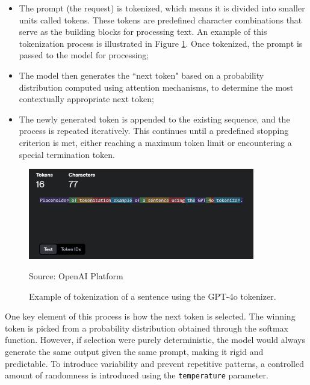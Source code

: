 \begin{itemize}
  \item The prompt (the request) is tokenized, which means it is divided into
    smaller units called tokens. These tokens are predefined character combinations
    that serve as the building blocks for processing text. An example of this
    tokenization process is illustrated in Figure \ref{fig:tokenization_example}.
    Once tokenized, the prompt is passed to the model for processing;

  \item The model then generates the ``next token" based on a probability
    distribution computed using attention mechanisms, to determine the most contextually
    appropriate next token;

  \item The newly generated token is appended to the existing sequence, and the
    process is repeated iteratively. This continues until a predefined stopping criterion
    is met, either reaching a maximum token limit or encountering a special
    termination token.
\end{itemize}

\begin{figure}[h!]
  \centering
  \includegraphics[width=0.88\textwidth]{images/tokenization_example.png}
  \caption{Example of tokenization of a sentence using the GPT-4o tokenizer.}
  { Source: OpenAI Platform\footnotemark} \label{fig:tokenization_example}
\end{figure}

One key element of this process is how the next token is selected. The winning token
is picked from a probability distribution obtained through the softmax function.
However, if selection were purely deterministic, the model would always generate
the same output given the same prompt, making it rigid and predictable. To
introduce variability and prevent repetitive patterns, a controlled amount of randomness
is introduced using the \texttt{temperature} parameter.

